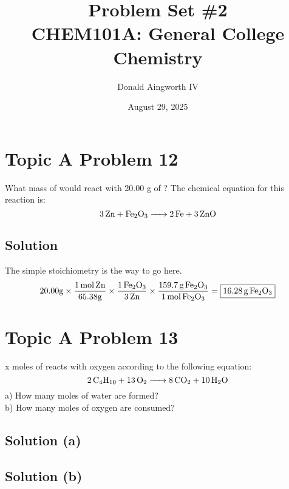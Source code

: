 \documentclass[10pt]{article}
\title{
    Problem Set \#2
    \\  \small
    CHEM101A: General College Chemistry
    }
\author{Donald Aingworth IV}
\date{August 29, 2025}
\begin{document}
    \maketitle

    \pagebreak
    \section{Topic A Problem 12}
        What mass of  would react with 20.00 g of ? 
        The chemical equation for this reaction is: 
        \begin{equation}
            \ce{3Zn + Fe2O3 -> 2Fe + 3ZnO}
        \end{equation}

        \subsection{Solution}
            The simple stoichiometry is the way to go here.
            \begin{equation}
                20.00 \unit{\gram} \times \frac{1\,\unit{\mole}\,\ce{Zn}}{65.38 \unit{\gram}} \times \frac{1\,\ce{Fe2O3}}{3\,\ce{Zn}} \times \frac{159.7\,\unit{\gram}\,\ce{Fe2O3}}{1\,\unit{\mole}\,\ce{Fe2O3}}  =   \boxed{16.28\,\unit{\gram}\,\ce{Fe2O3}}
            \end{equation}
            

    \pagebreak
    \section{Topic A Problem 13}
        x moles of  reacts with oxygen according to the following equation: 
        \begin{equation}
            \ce{2C4H10 + 13O2 -> 8CO2 + 10H2O}
        \end{equation}
        a) How many moles of water are formed?\\
        b) How many moles of oxygen are consumed?

        \subsection{Solution (a)}

        \subsection{Solution (b)}

    \pagebreak
\end{document}
